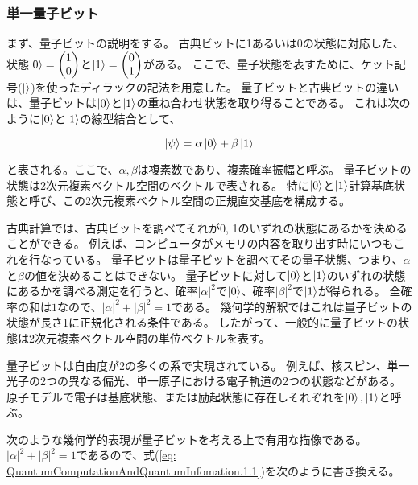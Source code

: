\documentclass[platex,dvipdfmx, titlepage]{jlreq}			%
\begin{document}
\subsubsection{単一量子ビット}
まず、量子ビットの説明をする。
古典ビットに1あるいは0の状態に対応した、
状態$\ket{0} = \begin{pmatrix}
    1 \\
    0
\end{pmatrix}$と$\ket{1} = \begin{pmatrix}
    0 \\
    1
\end{pmatrix}$がある。
ここで、量子状態を表すために、ケット記号($\ket{}$)を使ったディラックの記法を用意した。
量子ビットと古典ビットの違いは、量子ビットは$\ket{0}$と$\ket{1}$の重ね合わせ状態を取り得ることである。
これは次のように$\ket{0}$と$\ket{1}$の線型結合として、

\begin{equation}
    \label{eq: QuantumComputationAndQuantumInfomation.1.1}
    \ket{\psi} = \alpha \ket{0} + \beta \ket{1}
\end{equation}

と表される。ここで、$\alpha, \beta$は複素数であり、複素確率振幅と呼ぶ。
量子ビットの状態は2次元複素ベクトル空間のベクトルで表される。
特に$\ket{0}$と$\ket{1}$計算基底状態と呼び、この2次元複素ベクトル空間の正規直交基底を構成する。

古典計算では、古典ビットを調べてそれが0, 1のいずれの状態にあるかを決めることができる。
例えば、コンピュータがメモリの内容を取り出す時にいつもこれを行なっている。
量子ビットは量子ビットを調べてその量子状態、つまり、$\alpha$と$\beta$の値を決めることはできない。
量子ビットに対して$\ket{0}$と$\ket{1}$のいずれの状態にあるかを調べる測定を行うと、確率$|\alpha|^2$で$\ket{0}$、確率$|\beta|^2$で$\ket{1}$が得られる。
全確率の和は$1$なので、$|\alpha|^2 + |\beta|^2 = 1$である。
幾何学的解釈ではこれは量子ビットの状態が長さ1に正規化される条件である。
したがって、一般的に量子ビットの状態は2次元複素ベクトル空間の単位ベクトルを表す。

\begin{comment}
    TODO: ここはもう少し具体的に修正
\end{comment}
量子ビットは自由度が2の多くの系で実現されている。
例えば、核スピン、単一光子の2つの異なる偏光、単一原子における電子軌道の2つの状態などがある。
原子モデルで電子は基底状態、または励起状態に存在しそれぞれを$\ket{0}, \ket{1}$と呼ぶ。

次のような幾何学的表現が量子ビットを考える上で有用な描像である。
$|\alpha|^2 + |\beta|^2 = 1$であるので、式(\ref{eq: QuantumComputationAndQuantumInfomation.1.1})を次のように書き換える。
\end{document}
